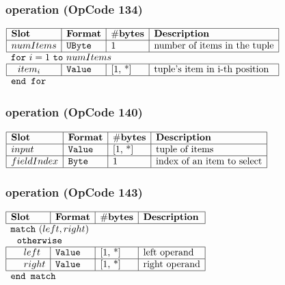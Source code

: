 
\subsubsection{ operation (OpCode 134)}

\noindent
\(\begin{array}{| l | l | l | l |}
    \hline
    \bf{Slot} & \bf{Format} & \bf{\#bytes} & \bf{Description} \\
    \hline
         numItems & \lst{UByte} & \text{1} & \text{number of items in the tuple} \\
    \hline
          \multicolumn{4}{l}{\lst{for}~i=1~\lst{to}~numItems} \\
    \hline
             ~~ item_i & \lst{Value} & \text{[1, *]} & \text{tuple's item in i-th position} \\
    \hline
          \multicolumn{4}{l}{\lst{end for}} \\
\end{array}\)
       

\subsubsection{ operation (OpCode 140)}

\noindent
\(\begin{array}{| l | l | l | l |}
    \hline
    \bf{Slot} & \bf{Format} & \bf{\#bytes} & \bf{Description} \\
    \hline
         input & \lst{Value} & \text{[1, *]} & \text{tuple of items} \\
    \hline
           fieldIndex & \lst{Byte} & \text{1} & \text{index of an item to select} \\
    \hline
      
\end{array}\)
       

\subsubsection{ operation (OpCode 143)}

\noindent
\(\begin{array}{| l | l | l | l |}
    \hline
    \bf{Slot} & \bf{Format} & \bf{\#bytes} & \bf{Description} \\
    \hline
        \multicolumn{4}{l}{\lst{match}~(left, right)} \\
         
    \multicolumn{4}{l}{~~\lst{otherwise} } \\
    \hline
            ~~~~ left & \lst{Value} & \text{[1, *]} & \text{left operand} \\
    \hline
          ~~~~ right & \lst{Value} & \text{[1, *]} & \text{right operand} \\
    \hline
          \multicolumn{4}{l}{\lst{end match}} \\
\end{array}\)
       

